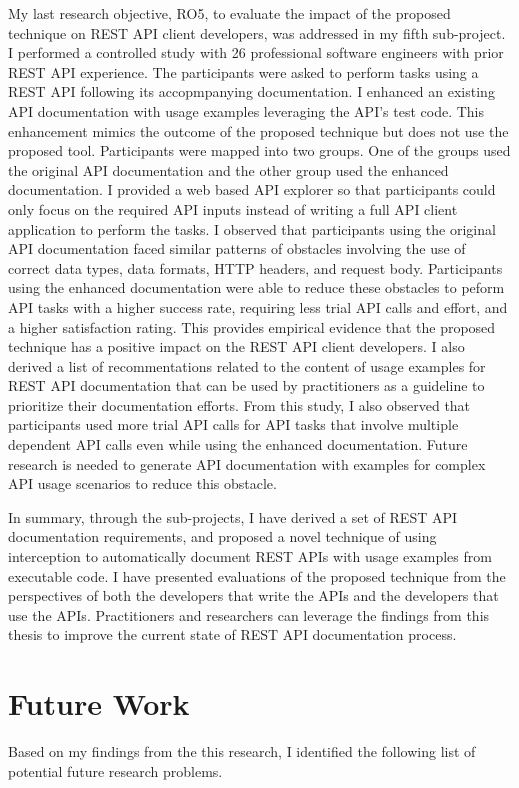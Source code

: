 \documentclass[12pt]{ucalgthes1}
\begin{document}
My last research objective, RO5, to evaluate the impact of the proposed technique on REST API client developers, was addressed in my fifth sub-project. I performed a controlled study with 26 professional software engineers with prior REST API experience. The participants were asked to perform tasks using a REST API following its accopmpanying documentation. I enhanced an existing API documentation with usage examples leveraging the API's test code. This enhancement mimics the outcome of the proposed technique but does not use the proposed tool. Participants were mapped into two groups. One of the groups used the original API documentation and the other group used the enhanced documentation. I provided a web based API explorer so that participants could only focus on the required API inputs instead of writing a full API client application to perform the tasks. I observed that participants using the original API documentation faced similar patterns of obstacles involving the use of correct data types, data formats, HTTP headers, and request body. Participants using the enhanced documentation were able to reduce these obstacles to peform API tasks with a higher success rate, requiring less trial API calls and effort, and a higher satisfaction rating. This provides empirical evidence that the proposed technique has a positive impact on the REST API client developers. I also derived a list of recommentations related to the content of usage examples for REST API documentation that can be used by practitioners as a guideline to prioritize their documentation efforts. From this study, I also observed that participants used more trial API calls for API tasks that involve multiple dependent API calls even while using the enhanced documentation. Future research is needed to generate API documentation with examples for complex API usage scenarios to reduce this obstacle.

In summary, through the sub-projects, I have derived a set of REST API documentation requirements, and proposed a novel technique of using interception to automatically document REST APIs with usage examples from executable code. I have presented evaluations of the proposed technique from the perspectives of both the developers that write the APIs and the developers that use the APIs. Practitioners and researchers can leverage the findings from this thesis to improve the current state of REST API documentation process.

\section{Future Work}
Based on my findings from the this research, I identified the following list of potential future research problems.
\end{document}
